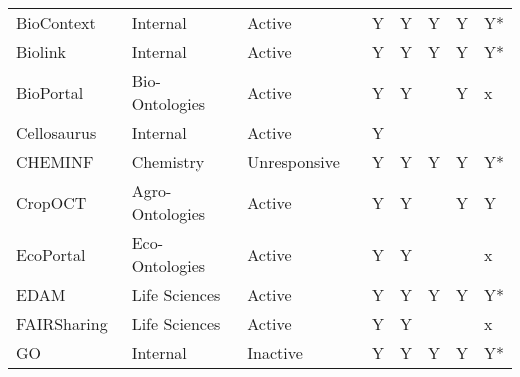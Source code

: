 \begin{table}
\begin{tabular}{lllllllll}
           BioContext~\cite{biocontext} &        Internal &       Active &                           &                      Y &                              Y &                      Y &                    Y &                     Y* \\
                Biolink~\cite{Unni2022} &        Internal &       Active &                           &                      Y &                              Y &                      Y &                    Y &                     Y* \\
           BioPortal~\cite{Whetzel2011} &  Bio-Ontologies &       Active &                           &                      Y &                              Y &                        &                    Y &                      x \\
         Cellosaurus~\cite{Bairoch2018} &        Internal &       Active &                           &                      Y &                                &                        &                      &                        \\
            CHEMINF~\cite{Hastings2011} &       Chemistry & Unresponsive &                           &                      Y &                              Y &                      Y &                    Y &                     Y* \\
              CropOCT~\cite{Arnaud2020} & Agro-Ontologies &       Active &                           &                      Y &                              Y &                        &                    Y &                      Y \\
      EcoPortal~\cite{Kechagioglou2021} &  Eco-Ontologies &       Active &                           &                      Y &                              Y &                        &                      &                      x \\
                                   EDAM &   Life Sciences &       Active &                           &                      Y &                              Y &                      Y &                    Y &                     Y* \\
         FAIRSharing~\cite{Sansone2019} &   Life Sciences &       Active &                           &                      Y &                              Y &                        &                      &                      x \\
GO~\cite{TheGeneOntologyConsortium2019} &        Internal &     Inactive &                           &                      Y &                              Y &                      Y &                    Y &                     Y* \\

\end{tabular}
\end{table}
